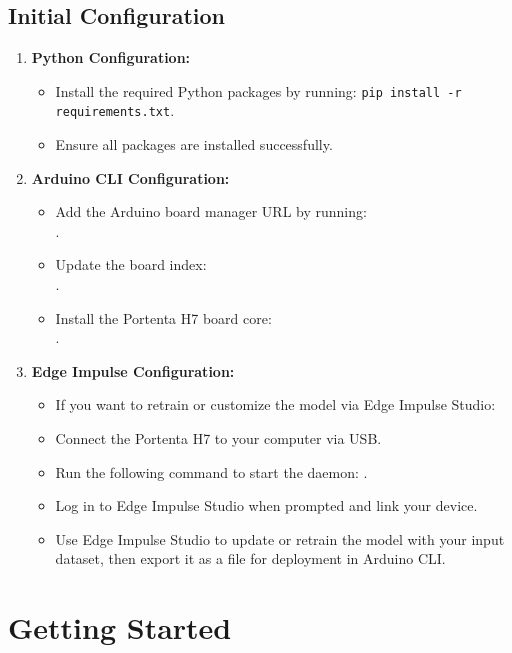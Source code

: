 \section{Initial Configuration}

\begin{enumerate}
	\item \textbf{Python Configuration:}
	\begin{itemize}
		\item Install the required Python packages by running: \texttt{pip install -r requirements.txt}.
		\item Ensure all packages are installed successfully.
	\end{itemize}
	
	\item \textbf{Arduino CLI Configuration:}
	\begin{itemize}
		\item Add the Arduino board manager URL by running:  
		\\ 
		.
		\item Update the board index: \\ .
		\item Install the Portenta H7 board core:
		\\ .
	\end{itemize}
	
	\item \textbf{Edge Impulse Configuration:}
	\begin{itemize}
		\item If you want to retrain or customize the model via Edge Impulse Studio:
		\item Connect the Portenta H7 to your computer via USB.
		\item Run the following command to start the daemon:  
		.
		\item Log in to Edge Impulse Studio when prompted and link your device.
		\item Use Edge Impulse Studio to update or retrain the model with your input dataset, then export it as a file  for deployment in Arduino CLI.
	\end{itemize}
\end{enumerate}


\chapter{Getting Started}

